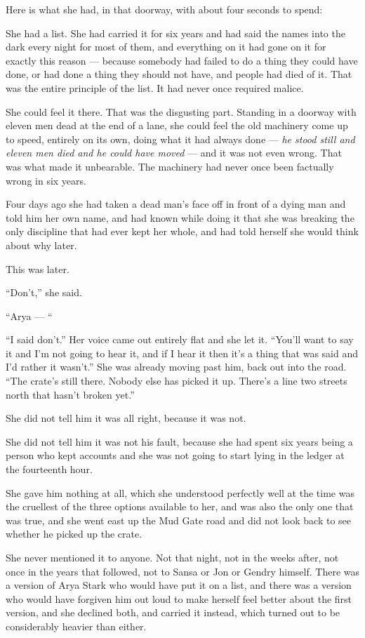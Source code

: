 Here is what she had, in that doorway, with about four seconds to spend:

She had a list. She had carried it for six years and had said the names into the dark every night for most of them, and everything on it had gone on it for exactly this reason — because somebody had failed to do a thing they could have done, or had done a thing they should not have, and people had died of it. That was the entire principle of the list. It had never once required malice.

She could feel it there. That was the disgusting part. Standing in a doorway with eleven men dead at the end of a lane, she could feel the old machinery come up to speed, entirely on its own, doing what it had always done — \textit{he stood still and eleven men died and he could have moved} — and it was not even wrong. That was what made it unbearable. The machinery had never once been factually wrong in six years.

Four days ago she had taken a dead man’s face off in front of a dying man and told him her own name, and had known while doing it that she was breaking the only discipline that had ever kept her whole, and had told herself she would think about why later.

This was later.

“Don’t,” she said.

“Arya — “

“I said don’t.” Her voice came out entirely flat and she let it. “You’ll want to say it and I’m not going to hear it, and if I hear it then it’s a thing that was said and I’d rather it wasn’t.” She was already moving past him, back out into the road. “The crate’s still there. Nobody else has picked it up. There’s a line two streets north that hasn’t broken yet.”

She did not tell him it was all right, because it was not.

She did not tell him it was not his fault, because she had spent six years being a person who kept accounts and she was not going to start lying in the ledger at the fourteenth hour.

She gave him nothing at all, which she understood perfectly well at the time was the cruellest of the three options available to her, and was also the only one that was true, and she went east up the Mud Gate road and did not look back to see whether he picked up the crate.

She never mentioned it to anyone. Not that night, not in the weeks after, not once in the years that followed, not to Sansa or Jon or Gendry himself. There was a version of Arya Stark who would have put it on a list, and there was a version who would have forgiven him out loud to make herself feel better about the first version, and she declined both, and carried it instead, which turned out to be considerably heavier than either.

